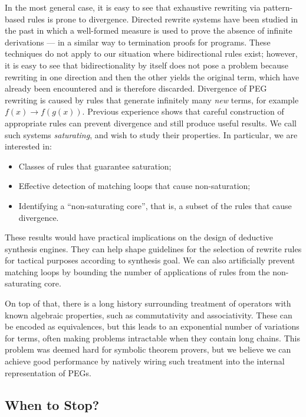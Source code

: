 In the most general case, it is easy to see that exhaustive rewriting via
pattern-based rules is prone to divergence.
Directed rewrite systems have been studied in the past in which a well-formed
measure is used to prove the absence of infinite derivations --- in a similar
way to termination proofs for programs.
These techniques do not apply to our situation where bidirectional rules exist;
however, it is easy to see that bidirectionality by itself does not pose a
problem because rewriting in one direction and then the other yields the
original term, which have already been encountered and is therefore discarded.
Divergence of PEG rewriting is caused by rules that generate infinitely many
\emph{new} terms, for example $f(x) \to f(g(x))$.
Previous experience shows that careful construction of appropriate rules can
prevent divergence and still produce useful results\cite{lpar2010}.
We call such systems \emph{saturating}, and wish to study their properties.
In particular, we are interested in:
\begin{itemize}
  \item Classes of rules that guarantee saturation;
  \item Effective detection of matching loops that cause non-saturation;
  \item Identifying a ``non-saturating core'', that is, a subset of the
    rules that cause divergence. 
\end{itemize}

These results would have practical implications on the design of
deductive synthesis engines.
They can help shape guidelines for the selection of rewrite rules for
tactical purposes according to synthesis goal.
We can also artificially prevent matching loops by bounding the number of
applications of rules from the non-saturating core.

On top of that, there is a long history surrounding treatment of
operators with known algebraic properties, such as commutativity
and associativity.
These can be encoded as equivalences, but this leads to an exponential
number of variations for terms, often making problems intractable when
they contain long chains.
This problem was deemed hard for symbolic theorem provers, but we
believe we can achieve good performance by natively wiring such treatment
into the internal representation of PEGs.

\subsection{When to Stop?}

